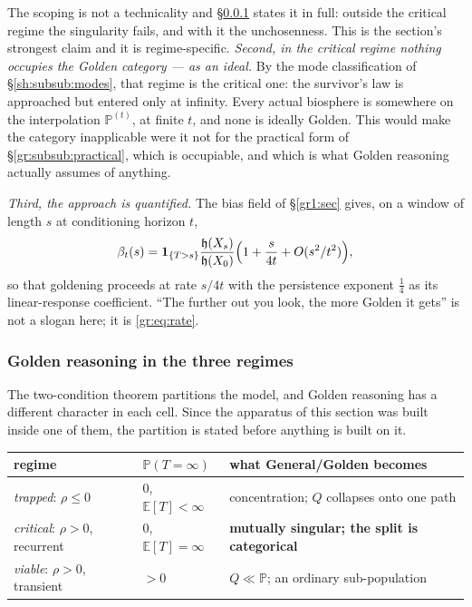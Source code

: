 \documentclass[11pt]{article}
\numberwithin{equation}{section}
\theoremstyle{plain}
\theoremstyle{definition}
\theoremstyle{remark}
\newcommand{\E}{\mathbb{E}}
\newcommand{\PP}{\mathbb{P}}
\newcommand{\one}{\mathbf{1}}
\newcommand{\hm}{\mathfrak{h}}
\begin{document}
The scoping is not a technicality and \S\ref{gr:subsub:regimes} states
it in full: outside the critical regime the singularity fails, and with
it the unchosenness. This is the section's strongest claim and it is
regime-specific. \emph{Second, in the critical regime nothing occupies the Golden
category --- as an ideal.} By the mode classification of
\S\ref{sh:subsub:modes}, that regime is the critical one: the survivor's
law is approached but entered only at infinity. Every actual biosphere is somewhere on the interpolation
$\PP^{(t)}$, at finite $t$, and none is ideally Golden. This would make
the category inapplicable were it not for the practical form of
\S\ref{gr:subsub:practical}, which is occupiable, and which is what
Golden reasoning actually assumes of anything.

\emph{Third, the approach is quantified.} The bias field of \S\ref{gr1:sec}
gives, on a window of length $s$ at conditioning horizon $t$,
\begin{equation}\label{gr:eq:rate}
\beta_t(s)=\one_{\{T>s\}}\frac{\hm(X_s)}{\hm(X_0)}
\Bigl(1+\frac{s}{4t}+O(s^{2}/t^{2})\Bigr),
\end{equation}
so that goldening proceeds at rate $s/4t$ with the persistence exponent
$\tfrac14$ as its linear-response coefficient. ``The further out you
look, the more Golden it gets'' is not a slogan here; it is
\eqref{gr:eq:rate}.

\subsubsection{Golden reasoning in the three regimes}
\label{gr:subsub:regimes}

The two-condition theorem partitions the model, and Golden reasoning has
a different character in each cell. Since the apparatus of this section
was built inside one of them, the partition is stated before anything is
built on it.

\begin{center}\small
\begin{tabular}{@{}lll@{}}
\toprule
regime & $\PP(T=\infty)$ & what General/Golden becomes\\
\midrule
\emph{trapped}: $\rho\le0$ & $0$, $\E[T]<\infty$ &
concentration; $Q$ collapses onto one path\\
\emph{critical}: $\rho>0$, recurrent & $0$, $\E[T]=\infty$ &
\textbf{mutually singular; the split is categorical}\\
\emph{viable}: $\rho>0$, transient & $>0$ &
$Q\ll\PP$; an ordinary sub-population\\
\bottomrule
\end{tabular}
\end{center}
\end{document}

